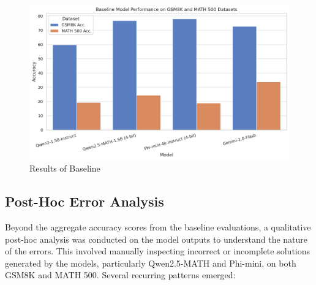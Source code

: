 \documentclass[11pt]{article}
\begin{document}
\begin{figure}
    \centering
    \includegraphics[width=1\linewidth]{Baseline result.png}
    \caption{Results of Baseline}
    \label{fig:enter-label}
\end{figure}



\subsection{Post-Hoc Error Analysis}
Beyond the aggregate accuracy scores from the baseline evaluations, a qualitative post-hoc analysis was conducted on the model outputs to understand the nature of the errors. This involved manually inspecting incorrect or incomplete solutions generated by the models, particularly Qwen2.5-MATH and Phi-mini, on both GSM8K and MATH 500. Several recurring patterns emerged:
\end{document}

